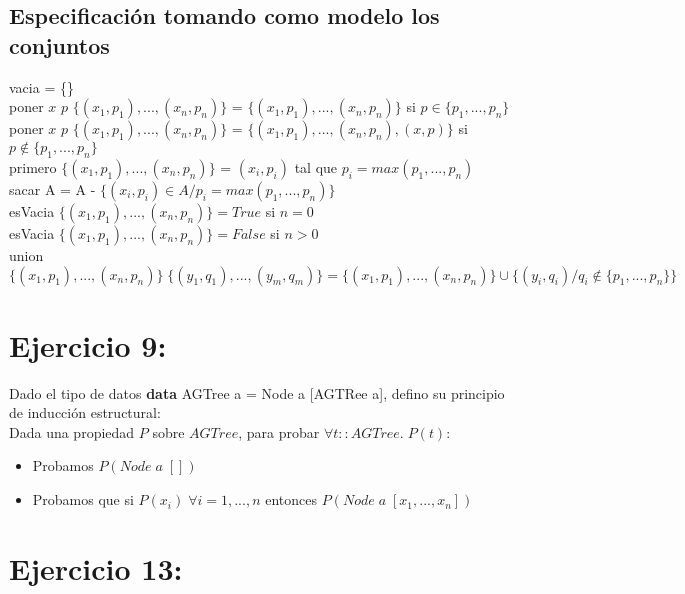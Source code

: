 \documentclass[11pt]{article}
\begin{document}
\subsection*{Especificación tomando como modelo los conjuntos}
\noindent vacia = \{\} \\
poner $x$ $p$ $\{(x_1,p_1),...,(x_n,p_n)\}$ = $\{(x_1,p_1),...,(x_n,p_n)\}$
si $p \in \{p_1,...,p_n\}$  \\
poner $x$ $p$ $\{(x_1,p_1),...,(x_n,p_n)\}$ = $\{(x_1,p_1),...,(x_n,p_n), (x, p)\}$
si $p \notin \{p_1,...,p_n\}$  \\
primero $\{(x_1,p_1),...,(x_n,p_n)\}$ = $(x_i,p_i)$ tal que $p_i = max(p_1,...,p_n)$ \\
sacar A = A - $\{(x_i, p_i) \in A / p_i = max(p_1,...,p_n)\}$ \\
esVacia $\{(x_1,p_1),...,(x_n,p_n)\} = True $ si $n = 0$ \\
esVacia $\{(x_1,p_1),...,(x_n,p_n)\} = False$ si $n > 0$ \\
union $\{(x_1,p_1),...,(x_n,p_n)\} \; \{(y_1,q_1),...,(y_m,q_m)\} =
\{(x_1,p_1),...,(x_n,p_n)\} \cup \{(y_i,q_i) / q_i \notin \{p_1,...,p_n\}\} $


\section*{Ejercicio 9:}
\noindent Dado el tipo de datos \textbf{data} AGTree a = Node a [AGTRee a],
defino su principio de inducción estructural: \\
Dada una propiedad $P$ sobre $AGTree$, para probar $\forall t::AGTree. \; P(t)$:
\begin{itemize}
  \item Probamos $P(Node \; a \; [])$
  \item Probamos que si $P(x_i) \; \forall i = 1,...,n$ entonces $P(Node \; a \; [x_1,...,x_n])$
\end{itemize}


\section*{Ejercicio 13:}
\end{document}
